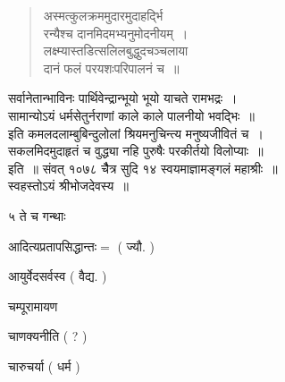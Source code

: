 \documentclass[11pt, openany]{book}
\makeatletter
\newcommand{\devanagarinumeral}[1]{
\devanagaridigits{\number \csname c@#1\endcsname}} %
\makeatother
\begin{document}
\begin{multicols}{2}
\begin{quote}
{अस्मत्कुलक्रममुदारमुदाहर्द्भि \textendash\ \\
रन्यैश्च दानमिदमभ्यनुमोदनीयम्~।\\
लक्ष्म्यास्तडित्सलिलबुद्धुदचञ्चलाया \\
दानं फलं परयशःपरिपालनं च~॥}
\end{quote}

\noindent
सर्वानेतान्भाविनः पार्थिवेन्द्रान्भूयो भूयो याचते रामभद्रः~।\\
सामान्योऽयं धर्मसेतुर्नराणां काले काले पालनीयो भवद्भिः~॥\\
इति कमलदलाम्बुबिन्दुलोलां श्रियमनुचिन्त्य मनुष्यजीवितं च~। \\
सकलमिदमुदाहृतं च वुद्ध्या नहि पुरुषैः परकीर्तयो विलोप्याः~॥\\
इति~॥ संवत् १०७८ चैैत्र सुदि १४ स्वयमाज्ञामङ्गलं महाश्रीः~॥ \\
स्वहस्तोऽयं श्रीभोजदेवस्य~॥ 

५ ते च गन्थाः \textendash\ 

आदित्यप्रतापसिद्धान्तः$=$ ( ज्यौ. ) 

आयुर्वेदसर्वस्व ( वैद्य. ) 

चम्पूरामायण 

चाणक्यनीति ( ? ) 

चारुचर्या ( धर्म ) 
\end{multicols}

\fancyhead[RO,LE]{\thepage}
\cfoot{}
\newpage
\renewcommand{\thepage}{\devanagarinumeral{page}}
\setcounter{page}{19}
\end{document}
